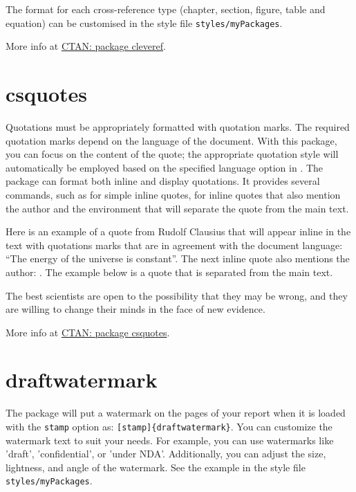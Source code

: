 The format for each cross-reference type (chapter, section, figure, table and equation) can be customised in the style file \verb|styles/myPackages|. 

More info at \href{https://ctan.org/pkg/cleveref}{CTAN: package cleveref}.

\section{csquotes}\label{sec:csquotes}
Quotations must be appropriately formatted with quotation marks. The required quotation marks depend on the language of the document. With this package, you can focus on the content of the quote; the appropriate quotation style will automatically be employed based on the specified language option in . The package can format both inline and display quotations. It provides several commands, such as  for simple inline quotes,  for inline quotes that also mention the author and the  environment that will separate the quote from the main text.

Here is an example of a quote from Rudolf Clausius that will appear inline in the text with quotations marks that are in agreement with the document language: \enquote{The energy of the universe is constant}. The next inline quote also mentions the author: . The example below is a quote that is separated from the main text.
\begin{displayquote}
The best scientists are open to the possibility that they may be wrong, and they are willing to change their minds in the face of new evidence.
\end{displayquote}

More info at \href{https://ctan.org/pkg/csquotes}{CTAN: package csquotes}.

\section{draftwatermark}\label{sec:draftwatermark}
The package  will put a watermark on the pages of your report when it is loaded with the \texttt{stamp} option as: \verb|[stamp]{draftwatermark}|. You can customize the watermark text to suit your needs. For example, you can use watermarks like 'draft', 'confidential', or 'under NDA'. Additionally, you can adjust the size, lightness, and angle of the watermark. See the example in the style file \texttt{styles/myPackages}.

